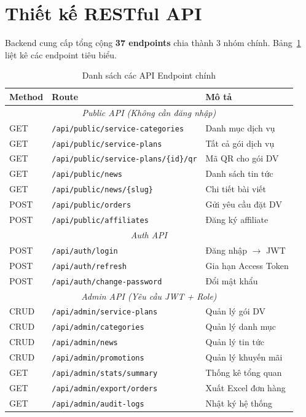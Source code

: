 \section{Thiết kế RESTful API}
Backend cung cấp tổng cộng \textbf{37 endpoints} chia thành 3 nhóm chính. Bảng~\ref{tab:api_endpoints} liệt kê các endpoint tiêu biểu.

\begin{table}[htbp]
    \centering
    \caption{Danh sách các API Endpoint chính}
    \label{tab:api_endpoints}
    \begin{tabular}{|p{1.5cm}|p{5.5cm}|p{5cm}|}
        \hline
        \textbf{Method} & \textbf{Route} & \textbf{Mô tả} \\
        \hline
        \multicolumn{3}{|c|}{\textit{Public API (Không cần đăng nhập)}} \\
        \hline
        GET & \texttt{/api/public/service-categories} & Danh mục dịch vụ \\
        GET & \texttt{/api/public/service-plans} & Tất cả gói dịch vụ \\
        GET & \texttt{/api/public/service-plans/\{id\}/qr} & Mã QR cho gói DV \\
        GET & \texttt{/api/public/news} & Danh sách tin tức \\
        GET & \texttt{/api/public/news/\{slug\}} & Chi tiết bài viết \\
        POST & \texttt{/api/public/orders} & Gửi yêu cầu đặt DV \\
        POST & \texttt{/api/public/affiliates} & Đăng ký affiliate \\
        \hline
        \multicolumn{3}{|c|}{\textit{Auth API}} \\
        \hline
        POST & \texttt{/api/auth/login} & Đăng nhập $\rightarrow$ JWT \\
        POST & \texttt{/api/auth/refresh} & Gia hạn Access Token \\
        POST & \texttt{/api/auth/change-password} & Đổi mật khẩu \\
        \hline
        \multicolumn{3}{|c|}{\textit{Admin API (Yêu cầu JWT + Role)}} \\
        \hline
        CRUD & \texttt{/api/admin/service-plans} & Quản lý gói DV \\
        CRUD & \texttt{/api/admin/categories} & Quản lý danh mục \\
        CRUD & \texttt{/api/admin/news} & Quản lý tin tức \\
        CRUD & \texttt{/api/admin/promotions} & Quản lý khuyến mãi \\
        GET & \texttt{/api/admin/stats/summary} & Thống kê tổng quan \\
        GET & \texttt{/api/admin/export/orders} & Xuất Excel đơn hàng \\
        GET & \texttt{/api/admin/audit-logs} & Nhật ký hệ thống \\
        \hline
    \end{tabular}
\end{table}

